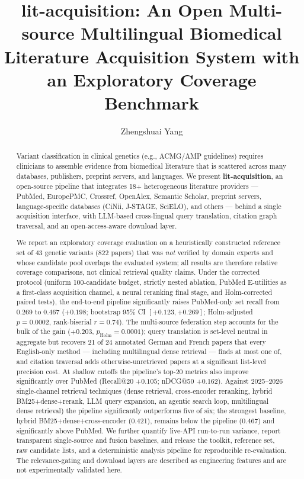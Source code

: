 \documentclass[nonacm,sigconf]{acmart}
\begin{document}
\title{lit-acquisition: An Open Multi-source Multilingual Biomedical
Literature Acquisition System with an Exploratory Coverage Benchmark}

\author{Zhengshuai Yang}

\renewcommand{\shortauthors}{Yang}

\begin{abstract}
Variant classification in clinical genetics (e.g., ACMG/AMP guidelines)
requires clinicians to assemble evidence from biomedical literature that is
scattered across many databases, publishers, preprint servers, and languages.
We present \textbf{lit-acquisition}, an open-source pipeline that integrates
18+ heterogeneous literature providers --- PubMed, EuropePMC, Crossref,
OpenAlex, Semantic Scholar, preprint servers, language-specific databases
(CiNii, J-STAGE, SciELO), and others --- behind a single acquisition
interface, with LLM-based cross-lingual query translation, citation graph
traversal, and an open-access-aware download layer.

We report an exploratory coverage evaluation on a heuristically constructed
reference set of 43 genetic variants (822 papers) that was \emph{not}
verified by domain experts and whose candidate pool overlaps the evaluated
system; all results are therefore relative coverage comparisons, not
clinical retrieval quality claims. Under the corrected protocol (uniform
100-candidate budget, strictly nested ablation, PubMed E-utilities as a
first-class acquisition channel, a neural reranking final stage, and
Holm-corrected paired tests), the end-to-end pipeline significantly
raises PubMed-only set recall from 0.269 to 0.467 ($+0.198$; bootstrap
95\% CI $[+0.123, +0.269]$; Holm-adjusted $p{=}0.0002$, rank-biserial
$r{=}0.74$). The multi-source federation step accounts for the bulk of
the gain ($+0.203$, $p_{\text{Holm}}{=}0.0001$); query translation is
set-level neutral in aggregate but recovers 21 of 24 annotated German and
French papers that every English-only method --- including multilingual
dense retrieval --- finds at most one of, and citation traversal adds
otherwise-unretrieved papers at a significant list-level precision cost.
At shallow cutoffs the pipeline's top-20 metrics also improve
significantly over PubMed (Recall@20 $+0.105$; nDCG@50 $+0.162$). Against
2025--2026 single-channel retrieval techniques (dense retrieval,
cross-encoder reranking, hybrid BM25+dense+rerank, LLM query expansion,
an agentic search loop, multilingual dense retrieval) the pipeline
significantly outperforms five of six; the strongest baseline, hybrid
BM25+dense+cross-encoder (0.421), remains below the pipeline (0.467) and
significantly above PubMed. We further quantify live-API run-to-run
variance, report transparent single-source and fusion baselines, and
release the toolkit, reference set, raw candidate lists, and a
deterministic analysis pipeline for reproducible re-evaluation. The
relevance-gating and download layers are described as engineering features
and are not experimentally validated here.
\end{abstract}
\end{document}
